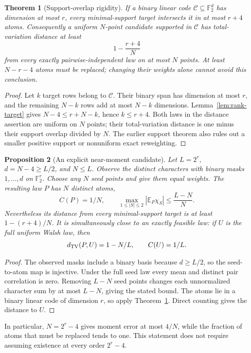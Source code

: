 \documentclass[11pt]{article}
\newtheorem{theorem}{Theorem}[section]
\newtheorem{proposition}[theorem]{Proposition}
\begin{document}
\begin{theorem}[Support-overlap rigidity]\label{thm:rank-overlap}
If a binary linear code $\mathcal C\subseteq\mathbb F_2^d$ has
dimension at most $r$, every minimal-support target intersects it in
at most $r+4$ atoms. Consequently a uniform $N$-point candidate
supported in $\mathcal C$ has total-variation distance at least
\[
 1-\frac{r+4}{N}
\]
from every exactly pairwise-independent law on at most $N$ points.
At least $N-r-4$ atoms must be replaced; changing their weights alone
cannot avoid this conclusion.
\end{theorem}
\begin{proof}
Let $k$ target rows belong to $\mathcal C$. Their binary span has
dimension at most $r$, and the remaining $N-k$ rows add at most
$N-k$ dimensions. Lemma~\ref{lem:rank-target} gives
$N-4\le r+N-k$, hence $k\le r+4$.
Both laws in the distance assertion are uniform on $N$ points;
their total-variation distance is one minus their support overlap
divided by $N$. The earlier support theorem also rules out a smaller
positive support or nonuniform exact reweighting.
\end{proof}

\begin{proposition}[An explicit near-moment candidate]
\label{prop:rank-walsh-candidate}
Let $L=2^r$, $d=N-4\ge L/2$, and $N\le L$. Observe the distinct
characters with binary masks $1,\ldots,d$ on $\mathbb F_2^r$.
Choose any $N$ seed points and give them equal weights. The resulting
law $P$ has $N$ distinct atoms,
\[
 C(P)=1/N,\qquad
 \max_{1\le|S|\le2}|\mathbb E_P\chi_S|\le\frac{L-N}{N}.
\]
Nevertheless its distance from every minimal-support target is at
least $1-(r+4)/N$.
It is simultaneously close to an exactly feasible law: if $U$ is
the full uniform Walsh law, then
\[
 d_{\rm TV}(P,U)=1-N/L,\qquad C(U)=1/L.
\]
\end{proposition}
\begin{proof}
The observed masks include a binary basis because $d\ge L/2$, so
the seed-to-atom map is injective. Under the full seed law every
mean and distinct pair correlation is zero. Removing $L-N$ seed
points changes each unnormalized character sum by at most $L-N$,
giving the stated bound. The atoms lie in a binary linear code of
dimension $r$, so apply Theorem~\ref{thm:rank-overlap}. Direct counting
gives the distance to $U$.
\end{proof}
In particular, $N=2^r-4$ gives moment error at most $4/N$, while the
fraction of atoms that must be replaced tends to one. This statement
does not require assuming existence at every order $2^r-4$.
\end{document}
